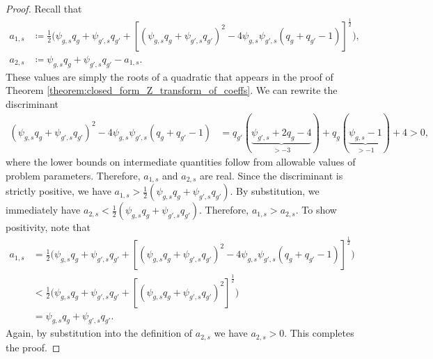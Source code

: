 \documentclass[letterpaper]{article} %
\begin{document}
\begin{proof}
Recall that
\begin{align*}
    a_{1,s} &\coloneqq \frac{1}{2} \big( \psi_{g,s}q_g + \psi_{g',s}q_{g'} + \left[ (\psi_{g,s}q_g + \psi_{g',s}q_{g'})^2 - 4 \psi_{g,s}\psi_{g',s}(q_g + q_{g'} -1) \right]^{\frac{1}{2}} \big), \\
    a_{2,s} &\coloneqq \psi_{g,s}q_g + \psi_{g',s}q_{g'} - a_{1,s}.
\end{align*}
These values are simply the roots of a quadratic that appears in the proof of Theorem \ref{theorem:closed_form_Z_transform_of_coeffs}. We can rewrite the discriminant
\begin{align*}
    (\psi_{g,s}q_g + \psi_{g',s}q_{g'})^2 - 4 \psi_{g,s}\psi_{g',s}(q_g + q_{g'} -1) &= q_{g'}(\underbrace{\psi_{g',s} + 2q_g - 4}_{>-3}) + q_g(\underbrace{\psi_{g,s} - 1}_{>-1}) + 4 > 0,
\end{align*}
where the lower bounds on intermediate quantities follow from allowable values of problem parameters. Therefore, $a_{1,s}$ and $a_{2,s}$ are real. Since the discriminant is strictly positive, we have $a_{1,s}>\frac{1}{2}( \psi_{g,s}q_g + \psi_{g',s}q_{g'})$. By substitution, we immediately have $a_{2,s}<\frac{1}{2}( \psi_{g,s}q_g + \psi_{g',s}q_{g'})$. Therefore, $a_{1,s} > a_{2,s}$. To show positivity, note that
\begin{align*}
    a_{1,s} &= \frac{1}{2} \big( \psi_{g,s}q_g + \psi_{g',s}q_{g'} + \left[ (\psi_{g,s}q_g + \psi_{g',s}q_{g'})^2 - 4 \psi_{g,s}\psi_{g',s}(q_g + q_{g'} -1) \right]^{\frac{1}{2}} \big) \\
    &< \frac{1}{2} \big( \psi_{g,s}q_g + \psi_{g',s}q_{g'} + \left[ (\psi_{g,s}q_g + \psi_{g',s}q_{g'})^2 \right]^{\frac{1}{2}} \big) \\
    &= \psi_{g,s}q_g + \psi_{g',s}q_{g'}.
\end{align*}
Again, by substitution into the definition of $a_{2,s}$ we have $a_{2,s}>0$. This completes the proof. 
\end{proof}
\end{document}
